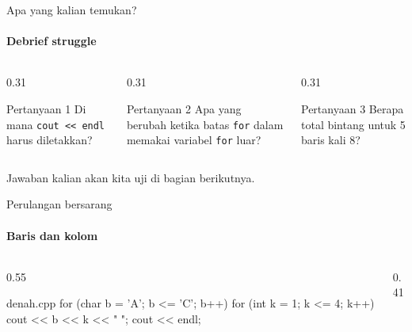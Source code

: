 \documentclass[t]{beamer}
\begin{document}
\begin{frame}{Apa yang kalian temukan?}
\framesubtitle{Debrief struggle}
\begin{columns}[T]
\begin{column}{0.31\textwidth}
\begin{BlokGelap}{Pertanyaan 1}
Di mana \texttt{cout << endl} harus diletakkan?
\end{BlokGelap}
\end{column}
\begin{column}{0.31\textwidth}
\begin{BlokGelap}{Pertanyaan 2}
Apa yang berubah ketika batas \texttt{for} dalam memakai variabel \texttt{for} luar?
\end{BlokGelap}
\end{column}
\begin{column}{0.31\textwidth}
\begin{BlokGelap}{Pertanyaan 3}
Berapa total bintang untuk 5 baris kali 8?
\end{BlokGelap}
\end{column}
\end{columns}
\vspace{10pt}
Jawaban kalian akan kita uji di bagian berikutnya.
\end{frame}


\begin{frame}[fragile]{Perulangan bersarang}
\framesubtitle{Baris dan kolom}
\begin{columns}[T]
\begin{column}{0.55\textwidth}
\begin{Kode}[]{denah.cpp}
for (char b = 'A'; b <= 'C'; b++) {
    for (int k = 1; k <= 4; k++) {
        cout << b << k << " ";
    }
    cout << endl;
}
\end{Kode}
\end{column}
\begin{column}{0.41\textwidth}
\end{column}
\end{columns}
\end{frame}
\end{document}
